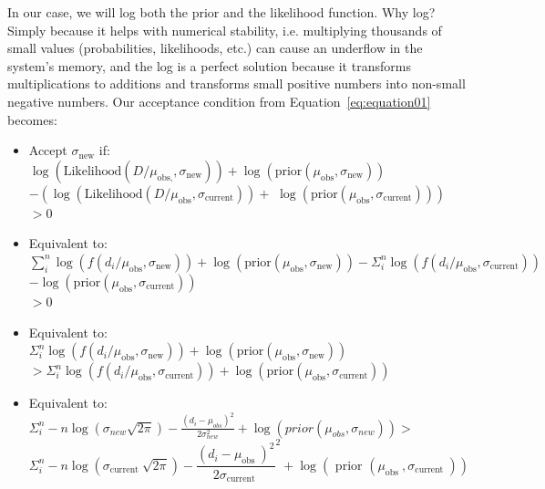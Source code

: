 In our case, we will log both the prior and the likelihood function. Why log? Simply because it helps with numerical stability, i.e. multiplying thousands of small values (probabilities, likelihoods, etc.) can cause an underflow in the system's memory, and the log is a perfect solution because it transforms multiplications to additions and transforms small positive numbers into non-small negative numbers.
Our acceptance condition from Equation~\ref{eq:equation01} becomes:
\begin{itemize}
\item Accept $\sigma_{\text {new}}$ if:\\
$\log\left(\text {Likelihood}\left(D / \mu_{\text {obs},}, \sigma_{\text {new}}\right)\right)+\log \left(\text {prior}\left(\mu_{\text {obs}}, \sigma_{\text {new}}\right)\right)$\\
$-\left(\log\left(\text {Likelihood}\left(D / \mu_{\text {obs}}, \sigma_{\text {current}}\right)\right)+\right.$
$\left.\log \left(\text {prior}\left(\mu_{\text {obs}}, \sigma_{\text {current}}\right)\right)\right)$\\
$>0$

\item Equivalent to:\\
$\sum_{i}^{n} \log \left(f\left(d_{i} / \mu_{\text {obs}}, \sigma_{\text {new}}\right)\right)+\log \left(\text {prior}\left(\mu_{\text {obs}}, \sigma_{\text {new}}\right)\right)-\Sigma_{i}^{n} \log \left(f\left(d_{i} / \mu_{\text {obs}}, \sigma_{\text {current}}\right)\right)$\\
$-\log \left(\text {prior}\left(\mu_{\text {obs}}, \sigma_{\text {current}}\right)\right)$\\
$>0$

\item Equivalent to:\\
$\Sigma_{i}^{n} \log \left(f\left(d_{i} / \mu_{\text {obs}}, \sigma_{\text {new}}\right)\right)+\log \left(\text {prior}\left(\mu_{\text {obs}}, \sigma_{\text {new}}\right)\right)$\\
$>\Sigma_{i}^{n} \log \left(f\left(d_{i} / \mu_{\text {obs}}, \sigma_{\text {current}}\right)\right)+\log \left(\text {prior}\left(\mu_{\text {obs}}, \sigma_{\text {current}}\right)\right)$

\item Equivalent to:\\
$\Sigma_{i}^{n}
-n \log \left(\sigma_{new} \sqrt{2 \pi}\right)
-\frac{\left(d_{i}-\mu_{obs}\right)^{2}}{2 \sigma_{new}^{2}}+
\log\left(prior\left(\mu_{obs}, \sigma_{new}\right)\right)>$
$$
\Sigma_{i}^{n}-n \log \left(\sigma_{\text {current }} \sqrt{2 \pi}\right)-\frac{\left(d_{i}-\mu_{\text {obs }}\right)^{2}}{2 \sigma_{\text {current }}}^{2}+\log\left(\text { prior }\left(\mu_{\text {obs }}, \sigma_{\text {current }}\right)\right)
$$
\end{itemize}


